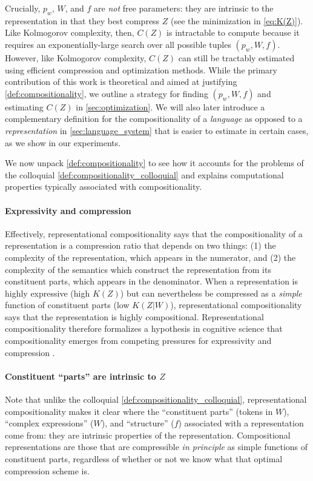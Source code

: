 \documentclass{article} %
\newcommand{\comp}{representational compositionality}
\newcommand{\Comp}{Representational compositionality}
\begin{document}
Crucially, $p_w$, $W$, and $f$ are \emph{not} free parameters: they are intrinsic to the representation in that they best compress $Z$ (see the minimization in \cref{eq:K(Z)}). Like Kolmogorov complexity, then, $C(Z)$ is intractable to compute because it requires an exponentially-large search over all possible tuples $(p_w, W, f)$. However, like Kolmogorov complexity, $C(Z)$ can still be tractably estimated using efficient compression and optimization methods. While the primary contribution of this work is theoretical and aimed at justifying \cref{def:compositionality}, we outline a strategy for finding $(p_w, W, f)$ and estimating $C(Z)$ in \cref{sec:optimization}. We will also later introduce a complementary definition for the compositionality of a \emph{language} as opposed to a \emph{representation} in \cref{sec:language_system} that is easier to estimate in certain cases, as we show in our experiments.

We now unpack \cref{def:compositionality} to see how it accounts for the problems of the colloquial \cref{def:compositionality_colloquial} and explains computational properties typically associated with compositionality.

\paragraph{Expressivity and compression}

Effectively, \comp{} says that the compositionality of a representation is a compression ratio that depends on two things: (1) the complexity of the representation, which appears in the numerator, and (2) the complexity of the semantics which construct the representation from its constituent parts, which appears in the denominator. When a representation is highly expressive (high $K(Z)$) but can nevertheless be compressed as a \emph{simple} function of constituent parts (low $K(Z|W)$), \comp{} says that the representation is highly compositional. \Comp{} therefore formalizes a hypothesis in cognitive science that compositionality emerges from competing pressures for expressivity and compression \citep[e.g.,][and references therein]{kirby1999function,kirby2004ug,kirby2008cumulative}.

\paragraph{Constituent ``parts'' are intrinsic to $Z$}

Note that unlike the colloquial \cref{def:compositionality_colloquial}, \comp{} makes it clear where the ``constituent parts'' (tokens in $W$), ``complex expressions'' ($W$), and ``structure'' ($f$) associated with a representation come from: they are intrinsic properties of the representation. Compositional representations are those that are compressible \emph{in principle} as simple functions of constituent parts, regardless of whether or not we know what that optimal compression scheme is.
\end{document}
